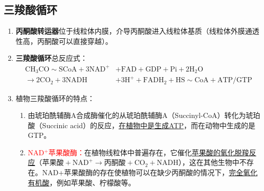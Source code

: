\subsection{三羧酸循环}
\begin{enumerate}
    \item \textbf{丙酮酸转运器}位于线粒体内膜，介导丙酮酸进入线粒体基质（线粒体外膜通透性高，丙酮酸可以直接穿越）。
    \item \textbf{三羧酸循环}总反应式：
    \[\begin{aligned}
        \text{CH}_3\text{CO}\sim\text{SCoA}+3\text{NAD}^+&+\text{FAD}+\text{GDP}+\text{Pi}+2\text{H}_2\text{O}\\\to 2\text{CO}_2+3\text{NADH}&+3\text{H}^++\text{FADH}_2+\text{HS}\sim\text{CoA}+\text{ATP/GTP}
    \end{aligned}\]
    \item 植物三羧酸循环的特点：
    \begin{enumerate}
        \item 由琥珀酰辅酶A合成酶催化的从琥珀酰辅酶A（Succinyl-CoA）转化为琥珀酸（Succinic acid）的反应，\uline{在植物中是生成ATP}，而在动物中生成的是GTP。
        \item \textcolor{red}{NAD$^+$苹果酸酶：}在植物线粒体中普遍存在，它催化\uline{苹果酸的氧化脱羧反应}（$\text{苹果酸}+\text{NAD}^+\to\text{丙酮酸}+\text{CO}_2+\text{NADH}$），这在其他生物中不存在。NAD+苹果酸酶的存在使植物可以在缺少丙酮酸的情况下，\uline{完全氧化有机酸}，例如苹果酸、柠檬酸等。
    \end{enumerate}
\end{enumerate}
